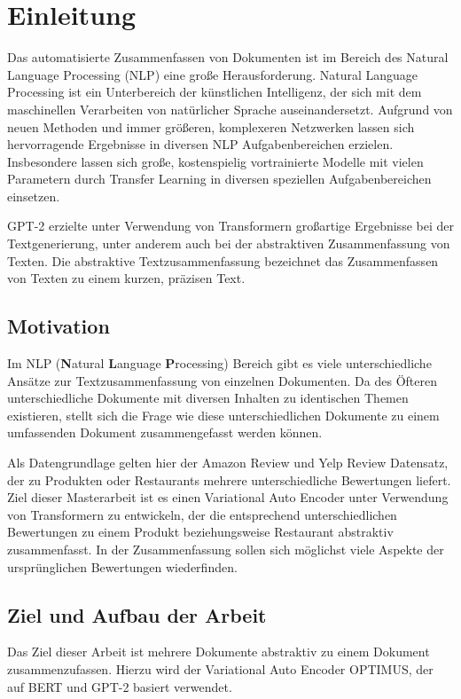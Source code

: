 \section{Einleitung}\raggedbottom
Das automatisierte Zusammenfassen von Dokumenten ist im Bereich des Natural Language Processing (NLP) eine große Herausforderung.
Natural Language Processing ist ein Unterbereich der künstlichen Intelligenz, der sich mit dem maschinellen Verarbeiten von natürlicher Sprache auseinandersetzt. 
Aufgrund von neuen Methoden und immer größeren, komplexeren Netzwerken lassen sich hervorragende Ergebnisse in diversen NLP Aufgabenbereichen erzielen. 
Insbesondere lassen sich große, kostenspielig vortrainierte Modelle mit vielen Parametern durch Transfer Learning in diversen speziellen Aufgabenbereichen einsetzen. 

GPT-2 erzielte unter Verwendung von Transformern großartige Ergebnisse bei der Textgenerierung, unter anderem auch bei der abstraktiven Zusammenfassung von Texten. 
Die abstraktive Textzusammenfassung bezeichnet das Zusammenfassen von Texten zu einem kurzen, präzisen Text. 

\subsection{Motivation}
Im NLP (\textbf{N}atural \textbf{L}anguage \textbf{P}rocessing) Bereich gibt es viele unterschiedliche Ansätze zur Textzusammenfassung von einzelnen Dokumenten.
Da des Öfteren unterschiedliche Dokumente mit diversen Inhalten zu identischen Themen existieren, stellt sich die Frage wie diese unterschiedlichen Dokumente zu einem umfassenden Dokument zusammengefasst werden können.

Als Datengrundlage gelten hier der Amazon Review und Yelp Review Datensatz, der zu Produkten oder Restaurants mehrere unterschiedliche Bewertungen liefert.
Ziel dieser Masterarbeit ist es einen Variational Auto Encoder unter Verwendung von Transformern zu entwickeln, der die entsprechend unterschiedlichen Bewertungen zu einem Produkt beziehungsweise Restaurant abstraktiv zusammenfasst.
In der Zusammenfassung sollen sich möglichst viele Aspekte der ursprünglichen Bewertungen wiederfinden.

\subsection{Ziel und Aufbau der Arbeit}
Das Ziel dieser Arbeit ist mehrere Dokumente abstraktiv zu einem Dokument zusammenzufassen. Hierzu wird der Variational Auto Encoder OPTIMUS, der auf BERT und GPT-2 basiert verwendet. 

